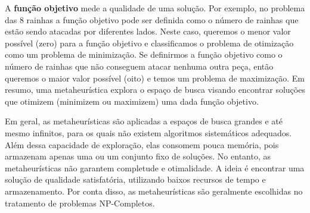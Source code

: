 A \textbf{função objetivo} mede a qualidade de uma solução. Por exemplo, no problema das 8 rainhas a função objetivo pode ser definida como o número de rainhas que estão sendo atacadas por diferentes lados. Neste caso, queremos o menor valor possível (zero) para a função objetivo e classificamos o problema de otimização como um problema de minimização. Se definirmos a função objetivo como o número de rainhas que não conseguem atacar nenhuma outra peça, então queremos o maior valor possível (oito) e temos um problema de maximização. Em resumo, uma metaheurística explora o espaço de busca visando encontrar soluções que otimizem (minimizem ou maximizem) uma dada função objetivo.

Em geral, as metaheurísticas são aplicadas a espaços de busca grandes e até mesmo infinitos, para os quais não existem algoritmos sistemáticos adequados. Além dessa capacidade de exploração, elas consomem pouca memória, pois armazenam apenas uma ou um conjunto fixo de soluções. No entanto, as metaheurísticas não garantem completude e otimalidade. A ideia é encontrar uma solução de qualidade satisfatória, utilizando baixos recursos de tempo e armazenamento. Por conta disso, as metaheurísticas são geralmente escolhidas no tratamento de problemas NP-Completos.

